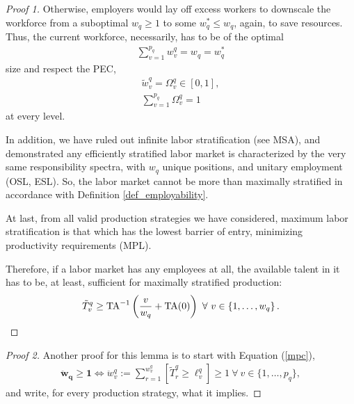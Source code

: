 \documentclass[hidelinks, nonatbib]{elsarticle}
\begin{document}
\begin{lemma}
\begin{proof}[Proof 1]
        Otherwise, employers would lay off excess workers to downscale the workforce from a suboptimal $w_q \geq 1$ to some $w_{q}^{*} \leq w_q$, again, to save resources. Thus, the current workforce, necessarily, has to be of the optimal
        \begin{gather}
        \sum_{v=1}^{p_q}
        w_{v}^{q}
        =
        w_q
        =
        w_{q}^{*}
        \end{gather}
        size and respect the PEC,
        \begin{gather}
        \tilde{w}_{v}^{q}
        =
        \Omega_{v}^{q}
        \in
        [0,1]
        ,
        \\
        \sum_{v=1}^{p_q}
        \Omega_{v}^{q}
        =
        1
        \end{gather}
        at every level.
        
        In addition, we have ruled out infinite labor stratification (see MSA), and demonstrated any efficiently stratified labor market is characterized by the very same responsibility spectra, with $w_q$ unique positions, and unitary employment (OSL, ESL). So, the labor market cannot be more than maximally stratified in accordance with Definition \ref{def_employability}. 
        
        At last, from all valid production strategies we have considered, maximum labor stratification is that which has the lowest barrier of entry, minimizing productivity requirements (MPL).
        
        Therefore, if a labor market has any employees at all, the available talent in it has to be, at least, sufficient for maximally stratified production:
        \begin{gather}
            \tilde{T}_{v}^{q}
            \geq
            \text{TA}^{-1}\left(
                \frac{v}{w_q}
                +
                \text{TA}(0)
            \right)
            \
            \forall
            \
            v \in 
            \left\{
                1, \dots, w_q
            \right\}
            .
        \end{gather}
    \end{proof}

    \begin{proof}[Proof 2]
        Another proof for this lemma is to start with Equation (\ref{mpc}),
        \begin{gather}
            \boldsymbol{\ddot{w}_q}
            \geq
            \boldsymbol{1}
            \iff
            \ddot{w}_{v}^{q}
            :=
            \sum_{r=1}^{w_{v}^{q}}
            [\tilde{T}_{r}^{q} \geq \ell_{v}^{q}]
            \geq
            1
            \
            \forall
            \
            v \in \{1, \dots, p_q\}
            ,
        \end{gather}
        and write, for every production strategy, what it implies. 


\end{proof}
\end{lemma}
\end{document}

